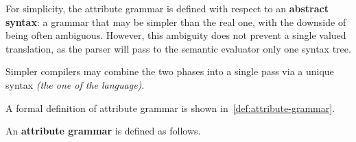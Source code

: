 \documentclass[english]{article}
\begin{document}
For simplicity, the attribute grammar is defined with respect to an \textbf{abstract syntax}:
a grammar that may be simpler than the real one, with the downside of being often ambiguous.
However, this ambiguity does not prevent a single valued translation, as the parser will pass to the semantic evaluator only one syntax tree.

Simpler compilers may combine the two phases into a single pass via a unique syntax \textit{(the one of the language)}.

\bigskip
A formal definition of attribute grammar is shown in~\ref{def:attribute-grammar}.

\begin{definition}
  \label{def:attribute-grammar}
  An \textbf{attribute grammar} is defined as follows.


\end{definition}
\end{document}
